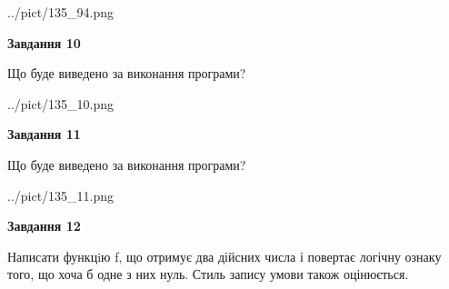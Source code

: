 \documentclass[12pt, ukrainian]{article}
\begin{document}
{\begin {large}
\begin{center}
	{../pict/135_94.png}
\end{center}
\newpage

{\begin {center}\textbf{Завдання 10}\end {center}}

Що буде виведено за виконання програми?\par
\begin{center}
	{../pict/135_10.png}
\end{center}
\newpage

{\begin {center}\textbf{Завдання 11}\end {center}}

Що буде виведено за виконання програми?\par
\begin{center}
	{../pict/135_11.png}
\end{center}
\newpage

{\begin {center}\textbf{Завдання 12}\end {center}}


Написати функцiю f, що отримує два дійсних числа і повертає логічну ознаку того, що хоча б одне з них нуль. Стиль запису умови також оцінюється.\par
\newpage

\end {large}}
\end{document}
